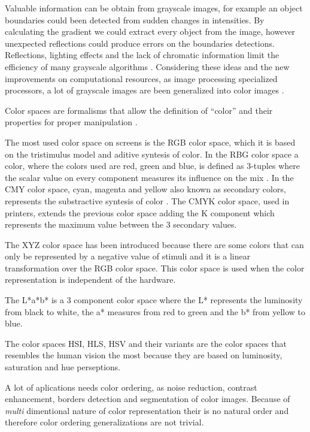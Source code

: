 Valuable information can be obtain from grayscale images, for example an object boundaries could been detected from sudden changes in intensities. By calculating the gradient  we could extract every object from the image, however unexpected reflections could produce errors on the boundaries detections. Reflections, lighting effects and the lack of chromatic information limit the efficiency of many grayscale algorithms \cite{ortiz2002procesamiento}. Considering these ideas and the new improvements on computational resources, as image processing specialized processors, a lot of grayscale images are been generalized into color images \cite{ortiz2002procesamiento}.
  
Color spaces are formalisms that allow the definition of ``color'' and their properties for proper manipulation \cite{joblove1978colo,meyer1980perceptual}.

The most used color space on screens is the RGB color space, which it is based on the tristimulus model and aditive syntesis of color. In the RBG color space a color, where the colors used are red, green and blue, is defined as 3-tuples where the scalar value on every component measures its influence on the mix \cite{tkalcic2003colour}. In the CMY color space, cyan, magenta and yellow also known as secondary colors, represents the substractive syntesis of color \cite{rolleston1996color}. The CMYK color space, used in printers\cite{rolleston1996color}, extends the previous color space adding the K component which represents the maximum value between the 3 secondary values\cite{tkalcic2003colour}.

The XYZ color space has been introduced because there are some colors that can only be represented by a negative value of stimuli and it is a linear transformation over the RGB color space\cite{ortiz2002procesamiento}. This color space is used when the color representation is independent of the hardware.

The L*a*b* is a 3 component color space where the L* represents the luminosity from black to white, the a* measures from red to green and the b* from yellow to blue\cite{leon2006color}.

The color spaces HSI, HLS, HSV and their variants are the color spaces that resembles the human vision the most because they are based on luminosity, saturation and hue perseptions\cite{zamora2001comparativos}.

A lot of aplications needs color ordering, as noise reduction, contrast enhancement, borders detection and segmentation of color images\cite{ortiz2002procesamiento}. Because of \textit{multi} dimentional nature of color representation their is no natural order and therefore color ordering generalizations are not trivial.

